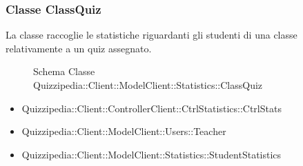 \subsubsection{Classe ClassQuiz}
La classe raccoglie le statistiche riguardanti gli studenti di una classe relativamente a un quiz assegnato.
\begin{figure}[H]
\centering
\noindent{}
\caption{Schema Classe Quizzipedia::Client::ModelClient::Statistics::ClassQuiz}
\end{figure}
\begin{itemize}
\item Quizzipedia::Client::ControllerClient::CtrlStatistics::CtrlStats
\item Quizzipedia::Client::ModelClient::Users::Teacher
\end{itemize}
\begin{itemize}
\item Quizzipedia::Client::ModelClient::Statistics::StudentStatistics
\end{itemize}
